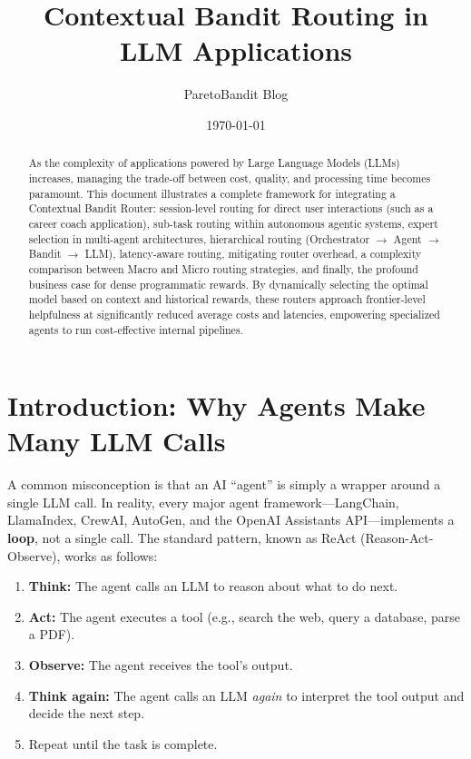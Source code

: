 \documentclass[12pt,a4paper]{article}
\title{Contextual Bandit Routing in LLM Applications}
\author{ParetoBandit Blog}
\date{\today}
\begin{document}
\maketitle

\begin{abstract}
As the complexity of applications powered by Large Language Models (LLMs) increases, managing the trade-off between cost, quality, and processing time becomes paramount. This document illustrates a complete framework for integrating a Contextual Bandit Router: session-level routing for direct user interactions (such as a career coach application), sub-task routing within autonomous agentic systems, expert selection in multi-agent architectures, hierarchical routing (Orchestrator $\rightarrow$ Agent $\rightarrow$ Bandit $\rightarrow$ LLM), latency-aware routing, mitigating router overhead, a complexity comparison between Macro and Micro routing strategies, and finally, the profound business case for dense programmatic rewards. By dynamically selecting the optimal model based on context and historical rewards, these routers approach frontier-level helpfulness at significantly reduced average costs and latencies, empowering specialized agents to run cost-effective internal pipelines.
\end{abstract}

\section{Introduction: Why Agents Make Many LLM Calls}

A common misconception is that an AI ``agent'' is simply a wrapper around a single LLM call. In reality, every major agent framework---LangChain, LlamaIndex, CrewAI, AutoGen, and the OpenAI Assistants API---implements a \textbf{loop}, not a single call. The standard pattern, known as ReAct (Reason-Act-Observe), works as follows:

\begin{enumerate}
    \item \textbf{Think:} The agent calls an LLM to reason about what to do next.
    \item \textbf{Act:} The agent executes a tool (e.g., search the web, query a database, parse a PDF).
    \item \textbf{Observe:} The agent receives the tool's output.
    \item \textbf{Think again:} The agent calls an LLM \textit{again} to interpret the tool output and decide the next step.
    \item Repeat until the task is complete.
\end{enumerate}
\end{document}
